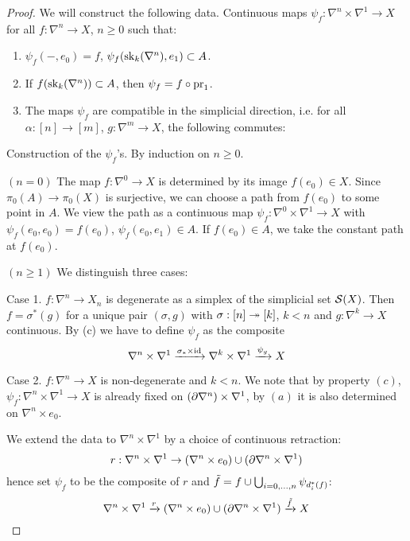 \begin{proof}
We will construct the following data. Continuous maps $\psi_f:\nabla^n\times\nabla^1\to X$ for all $f:\nabla^n\to X$, $n\geq 0$ such that:
\begin{enumerate}[label={(\alph*)}]
    \item $\psi_f(-,e_0)=f$, $\psi_f(\sk_k(\ns),e_1)\subset A$.
    \item If $f(\sk_k(\ns))\subset A$, then $\psi_f=f\circ\pr_1$.
    \item The maps $\psi_f$ are compatible in the simplicial direction, i.e. for all $\alpha:[n]\to[m]$, $g:\nabla^m\to X$, the following commutes:
    \begin{center}
    \end{center}
\end{enumerate}

Construction of the $\psi_f$'s. By induction on $n\geq0$.

$(n=0)$ The map $f:\nabla^0\to X$ is determined by its image $f(e_0)\in X$. Since $\pi_0(A)\to\pi_0(X)$ is surjective, we can choose a path from $f(e_0)$ to some point in $A$. We view the path as a continuous map $\psi_f:\nabla^0\times\nabla^1\to X$ with $\psi_f(e_0,e_0)=f(e_0)$, $\psi_f(e_0,e_1)\in A$. If $f(e_0)\in A$, we take the constant path at $f(e_0)$.

$(n\geq1)$ We distinguish three cases:

Case 1. $f:\nabla^n\to X_n$ is degenerate as a simplex of the simplicial set $\S(X)$. Then $f=\sigma^*(g)$ for a unique pair $(\sigma,g)$ with $\sigma:[n]\onto[k]$, $k<n$ and $g:\nabla^k\to X$ continuous. By (c) we have to define $\psi_f$ as the composite
\[\nabla^n\times\nabla^1\xto{\sigma_*\times\id}\nabla^k\times\nabla^1\xto{\psi_g} X\]

Case 2. $f:\nabla^n\to X$ is non-degenerate and $k<n$. We note that by property $(c)$, $\psi_f:\nabla^n\times\nabla^1\to X$ is already fixed on $(\de\nabla^n)\times\nabla^1$, by $(a)$ it is also determined on $\nabla^n\times e_0$.

We extend the data to $\nabla^n\times\nabla^1$ by a choice of continuous retraction:
\[r:\nabla^n\times\nabla^1\to (\nabla^n\times e_0)\cup(\de\nabla^n\times\nabla^1)\]
hence set $\psi_f$ to be the composite of $r$ and $\til f=f\cup\bigcup_{i=0,\dots,n}\psi_{d_i^*(f)}$\normalmarginpar{}:
\[\ns\times\sx{1}\xto{r}(\nabla^n\times e_0)\cup(\de\nabla^n\times\nabla^1)\xto{\til f} X\]


\end{proof}
